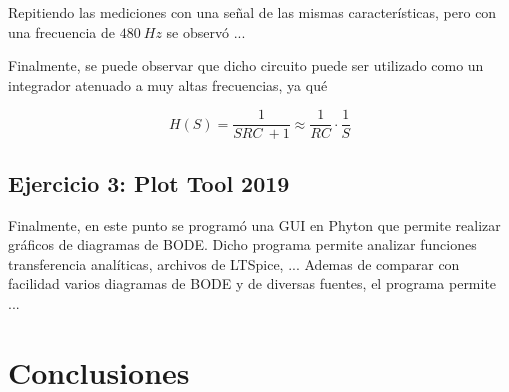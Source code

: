 \documentclass[a4paper]{article}
\begin{document}
Repitiendo las mediciones con una señal de las mismas características, pero con una frecuencia de $ 480 \ Hz $ se observó ...

Finalmente, se puede observar que dicho circuito puede ser utilizado como un integrador atenuado a muy altas frecuencias, ya qué

\begin{equation}
	H \left(S \right) = \frac{1}{SRC \ + 1} \approx \frac{1}{RC} \cdot \frac{1}{S}
\end{equation}

\subsection{Ejercicio 3: Plot Tool 2019}
Finalmente, en este punto se programó una GUI en Phyton que permite realizar gráficos de diagramas de BODE. Dicho programa permite analizar funciones transferencia analíticas, archivos de LTSpice, ... 
Ademas de comparar con facilidad varios diagramas de BODE y de diversas fuentes, el programa permite ...

\section{Conclusiones}
\end{document}
